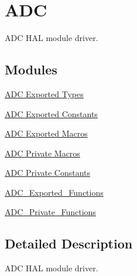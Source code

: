 \hypertarget{group___a_d_c}{}\section{A\+DC}
\label{group___a_d_c}


A\+DC H\+AL module driver.  


\subsection*{Modules}
\begin{DoxyCompactItemize}
\item 
\hyperlink{group___a_d_c___exported___types}{A\+D\+C Exported Types}
\item 
\hyperlink{group___a_d_c___exported___constants}{A\+D\+C Exported Constants}
\item 
\hyperlink{group___a_d_c___exported___macros}{A\+D\+C Exported Macros}
\item 
\hyperlink{group___a_d_c___private___macros}{A\+D\+C Private Macros}
\item 
\hyperlink{group___a_d_c___private___constants}{A\+D\+C Private Constants}
\item 
\hyperlink{group___a_d_c___exported___functions}{A\+D\+C\+\_\+\+Exported\+\_\+\+Functions}
\item 
\hyperlink{group___a_d_c___private___functions}{A\+D\+C\+\_\+\+Private\+\_\+\+Functions}
\end{DoxyCompactItemize}


\subsection{Detailed Description}
A\+DC H\+AL module driver. 

